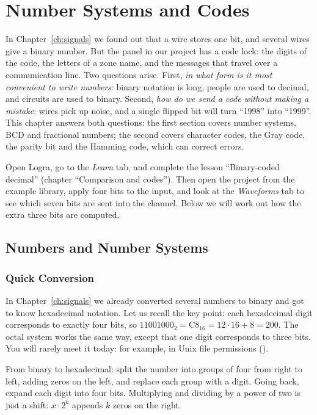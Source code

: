 \chapter{Number Systems and Codes}
\label{ch:codes}

In Chapter~\ref{ch:signals} we found out that a wire stores one bit, and
several wires give a binary number. But the panel in our project has a code
lock: the digits of the code, the letters of a zone name, and the messages that
travel over a communication line. Two questions arise. First, \emph{in what
form is it most convenient to write numbers}: binary notation is long, people
are used to decimal, and circuits are used to binary. Second, \emph{how do we
send a code without making a mistake}: wires pick up noise, and a single
flipped bit will turn ``1998'' into ``1999''.
This chapter answers both questions: the first section covers number systems,
BCD and fractional numbers; the second covers character codes, the Gray code,
the parity bit and the Hamming code, which can correct errors.

\begin{buildbox}
Open Logra, go to the \emph{Learn} tab, and complete the lesson ``Binary-coded
decimal'' (chapter ``Comparison and codes''). Then open the
 project from the example library, apply four bits to the
input, and look at the \emph{Waveforms} tab to see which seven bits are sent
into the channel. Below we will work out how the extra three bits are
computed.
\end{buildbox}

\section{Numbers and Number Systems}

\subsection{Quick Conversion}

In Chapter~\ref{ch:signals} we already converted several numbers to binary
and got to know hexadecimal notation. Let us recall the key point: each
hexadecimal digit corresponds to exactly four bits, so
$11001000_2 = \text{C8}_{16} = 12\cdot 16 + 8 = 200$. The octal system
works the same way, except that one digit corresponds to three bits. You will
rarely meet it today: for example, in Unix file permissions ().

\begin{infobox}
From binary to hexadecimal: split the number into groups of four from right to
left, adding zeros on the left, and replace each group with a digit. Going back,
expand each digit into four bits. Multiplying and dividing by a power of two is
just a shift: $x \cdot 2^k$ appends $k$ zeros on the right.
\end{infobox}

